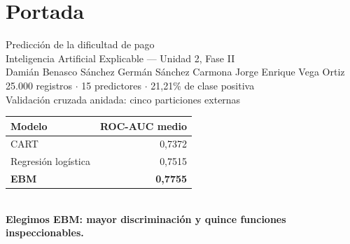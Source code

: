 \documentclass[aspectratio=169,10pt]{beamer}
\begin{document}
\section{Portada}
\begin{frame}
  \vspace{.35cm}
  \begin{center}
    {\LARGE Predicción de la dificultad de pago}\\[.22cm]
    {\normalsize Inteligencia Artificial Explicable --- Unidad 2, Fase II}\\[.35cm]
    {\small Damián Benasco Sánchez \quad Germán Sánchez Carmona \quad Jorge Enrique Vega Ortiz}\\[.3cm]
    {\small 25.000 registros $\cdot$ 15 predictores $\cdot$ 21,21\% de clase positiva}\\[.25cm]

    {\large Validación cruzada anidada: cinco particiones externas}\\[.15cm]
    \renewcommand{\arraystretch}{1.45}
    \begin{tabular}{@{}lr@{}}
      \toprule
      Modelo & ROC-AUC medio \\
      \midrule
      CART & 0,7372 \\
      Regresión logística & 0,7515 \\
      \textbf{EBM} & \textbf{0,7755} \\
      \bottomrule
    \end{tabular}\\[.42cm]
    \textbf{Elegimos EBM: mayor discriminación y quince funciones inspeccionables.}
  \end{center}
\end{frame}

\end{document}
